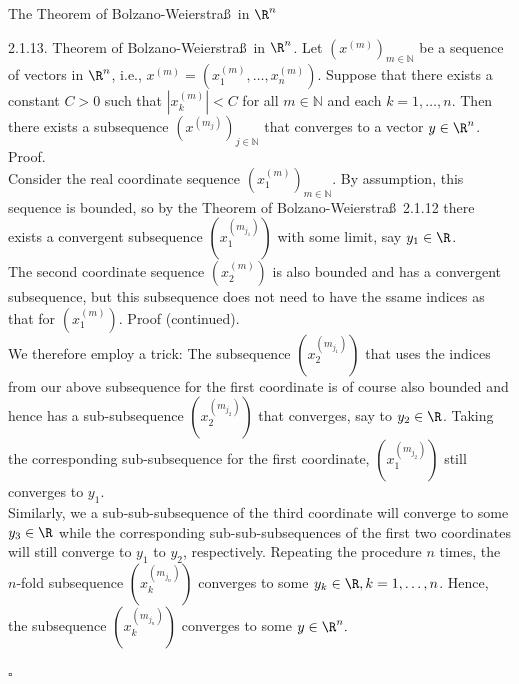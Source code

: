 \documentclass[smaller,hyperref={CJKbookmarks=true}]{beamer}
\newcommand{\N}{\mathbb{N}}
\begin{document}
\begin{frame}{The Theorem of Bolzano-Weierstra\ss~in $\R^n$}
\begin{spacing}{1.1}
\vspace*{11pt}
\alert{2.1.13. Theorem of Bolzano-Weierstra\ss~in $\R^n$.} Let $(x^{(m)})_{m\in\N}$ be a sequence of vectors in $\R^n$, i.e., $x^{(m)}=\left(x_1^{(m)},\ldots,x_n^{(m)}\right)$. Suppose that there exists a constant $C>0$ such that $\left|x_k^{(m)}\right|<C$ for all $m\in\N$ and each $k=1,\ldots,n$. Then there exists a subsequence $\left(x^{(m_j)}\right)_{j\in\N}$ that converges to a vector $y\in\R^n$.\\[7pt]
\alert{Proof.}\\
Consider the real coordinate sequence $\left(x_1^{(m)}\right)_{m\in\N}$. By assumption, this sequence is bounded, so by the Theorem of Bolzano-Weierstra\ss~2.1.12 there exists a convergent subsequence $\left(x_1^{(m_{j_1})}\right)$ with some limit, say $y_1\in\R$.\\[6pt]
The second coordinate sequence $\left(x_2^{(m)}\right)$ is also bounded and has a convergent subsequence, but this subsequence does not need to have the ssame indices as that for $\left(x_1^{(m)}\right)$.
\newpage
\alert{Proof (continued).}\\
We therefore employ a trick: The subsequence $(x_2^{(m_{j_1})})$ that uses the indices from our above subsequence for the first coordinate is of course also bounded and hence has a sub-subsequence $(x_2^{(m_{j_2})})$ that converges, say to $y_2\in\R$. Taking the corresponding sub-subsequence for the first coordinate, $(x_1^{(m_{j_2})})$ still converges to $y_1$.\\[6pt]
Similarly, we a sub-sub-subsequence of the third coordinate will converge
to some $y_3\in\R$ while the corresponding sub-sub-subsequences of the first two coordinates will still converge to $y_1$ to $y_2$, respectively. Repeating the procedure $n$ times, the $n$-fold subsequence $(x_k^{(m_{j_n})})$ converges to some $y_k\in\R,k=1,\ldots,n$. Hence, the subsequence $(x_k^{(m_{j_n})})$ converges to some $y\in\R^n.$
\begin{flushright}
  $\square$
\end{flushright}
\end{spacing}
\end{frame}
\end{document}
